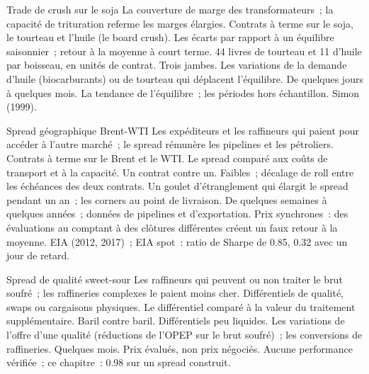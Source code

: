 \begin{strategyfile}{Trade de crush sur le soja}\label{strat:s2:commodity-spreads:crush}
 La couverture de marge des transformateurs~; la capacité de trituration referme les marges élargies.
 Contrats à terme sur le soja, le tourteau et l'huile (le board crush).
 Les écarts par rapport à un équilibre saisonnier~; retour à la moyenne à court terme.
 44 livres de tourteau et 11 d'huile par boisseau, en unités de contrat.
 Trois jambes.
 Les variations de la demande d'huile (biocarburants) ou de tourteau qui déplacent l'équilibre.
 De quelques jours à quelques mois.
 La tendance de l'équilibre~; les périodes hors échantillon.
 Simon (1999).
\end{strategyfile}

\begin{strategyfile}{Spread géographique Brent-WTI}\label{strat:s2:commodity-spreads:location}
 Les expéditeurs et les raffineurs qui paient pour accéder à l'autre marché~; le spread rémunère les pipelines et les pétroliers.
 Contrats à terme sur le Brent et le WTI.
 Le spread comparé aux coûts de transport et à la capacité.
 Un contrat contre un.
 Faibles~; décalage de roll entre les échéances des deux contrats.
 Un goulet d'étranglement qui élargit le spread pendant un an~; les corners au point de livraison.
 De quelques semaines à quelques années~; données de pipelines et d'exportation.
 Prix synchrones~: des évaluations au comptant à des clôtures différentes créent un faux retour à la moyenne.
 EIA (2012, 2017)~; EIA spot~: ratio de Sharpe de 0.85, 0.32 avec un jour de retard.
\end{strategyfile}

\begin{strategyfile}{Spread de qualité sweet-sour}\label{strat:s2:commodity-spreads:quality}
 Les raffineurs qui peuvent ou non traiter le brut soufré~; les raffineries complexes le paient moins cher.
 Différentiels de qualité, swaps ou cargaisons physiques.
 Le différentiel comparé à la valeur du traitement supplémentaire.
 Baril contre baril.
 Différentiels peu liquides.
 Les variations de l'offre d'une qualité (réductions de l'OPEP sur le brut soufré)~; les conversions de raffineries.
 Quelques mois.
 Prix évalués, non prix négociés.
 Aucune performance vérifiée~; ce chapitre~: 0.98 sur un spread construit.
\end{strategyfile}


